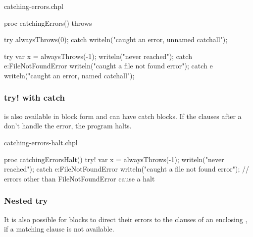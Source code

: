 \begin{chapelexample}{catching-errors.chpl}
\begin{chapel}
proc catchingErrors() throws {
  try {
    alwaysThrows(0);
  } catch {
    writeln("caught an error, unnamed catchall");
  }

  try {
    var x = alwaysThrows(-1);
    writeln("never reached");
  } catch e:FileNotFoundError {
    writeln("caught a file not found error");
  } catch e {
    writeln("caught an error, named catchall");
  }
}
\end{chapel}
\begin{chapelpost}
\end{chapelpost}
\begin{chapeloutput}
\end{chapeloutput}
\end{chapelexample}

\subsubsection{try! with catch}
\label{try_bang_with_catch}

 is also available in block form and can have catch blocks.
If the  clauses after a  don't handle the error,
the program halts.

\begin{chapelexample}{catching-errors-halt.chpl}
\begin{chapel}
proc catchingErrorsHalt() {
  try! {
    var x = alwaysThrows(-1);
    writeln("never reached");
  } catch e:FileNotFoundError {
    writeln("caught a file not found error");
  }
  // errors other than FileNotFoundError cause a halt
}
\end{chapel}
\begin{chapelpost}
\end{chapelpost}
\begin{chapeloutput}
\end{chapeloutput}
\end{chapelexample}

\subsubsection{Nested try}
\label{Nested_try}

It is also possible for  blocks to direct their errors to the
 clauses of an enclosing , if a matching
 clause is not available.

